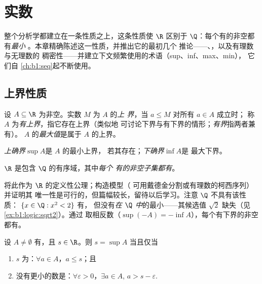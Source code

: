 \chapter{实数}\label{ch:b1:reals}

整个分析学都建立在一条性质之上，这条性质使 $\R$ 区别于
$\Q$：每个有的非空都有\emph{最小}
。本章精确陈述这一性质，并推出它的最初几个
推论——、，以及有理数与无理数的
稠密性——并建立下文频繁使用的术语（sup、inf、max、min），
它们自
\cref{ch:b1:seq}起不断使用。

\section{上界性质}

\begin{definition}[界、上确界与下确界]\label{def:b1:reals:bounds}
设 $A \subseteq \R$ 为非空。实数 $M$ 为 $A$ 的\emph{上
界}，当 $a \leq M$ 对所有 $a \in A$ 成立时；
称 $A$ 为\emph{有上界}，指它存在上界（类似地
可讨论下界与有下界的情形；\emph{有界}指两者兼有）。
$A$ 的\emph{最大值}是属于 $A$ 的上界。

\emph{上确界}$\sup A$是 $A$ 的最小上界，
若其存在；\emph{下确界}$\inf A$是
最大下界。
\end{definition}

\begin{theorem}[$\R$ 的完备性公理]\label{thm:b1:reals:sup}
$\R$ 是包含 $\Q$ 的有序域，其中\emph{每个
有的非空子集都有}。
\end{theorem}
\admitted

\begin{remark}
将此作为 $\R$ 的定义性公理；构造模型（
可用戴德金分割或有理数的柯西序列）并证明其
唯一性是可行的，但篇幅较长，留待以后学习。注意
$\Q$ 不具有该性质： $\{x \in \Q : x^2 < 2\}$ 有，
但没有\emph{在 $\Q$ 中}的最小——其候选值
$\sqrt 2$ 缺失（见\cref{ex:b1:logic:sqrt2}）。通过
取相反数（$\sup(-A) = -\inf A$），每个有下界的非空
都有。
\end{remark}

\begin{proposition}[$\varepsilon$ 刻画]\label{prop:b1:reals:epsilon}
设 $A \neq \emptyset$ 有，且 $s \in \R$。则 $s =
\sup A$ 当且仅当
\begin{enumerate}
  \item $s$ 为：$\forall a \in A$，$a \leq s$；且
  \item 没有更小的数是：$\forall \varepsilon > 0$，$\exists a \in
        A$, $a > s - \varepsilon$.
\end{enumerate}
\end{proposition}


